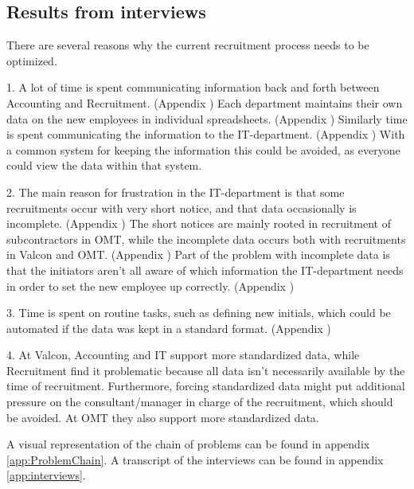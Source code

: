 \subsection{Results from interviews}
There are several reasons why the current recruitment process needs to be optimized.

1. A lot of time is spent communicating information back and forth between Accounting and Recruitment.
(Appendix )
Each department maintains their own data on the new employees in individual spreadsheets.
(Appendix )
Similarly time is spent communicating the information to the IT-department.
(Appendix )
With a common system for keeping the information this could be avoided, as everyone could view the data within that system.

2. The main reason for frustration in the IT-department is that some recruitments occur with very short notice, and that data occasionally is incomplete.
(Appendix )
The short notices are mainly rooted in recruitment of subcontractors in OMT,
while the incomplete data occurs both with recruitments in Valcon and OMT.
(Appendix )
Part of the problem with incomplete data is that the initiators aren't all aware of which information the IT-department needs in order to set the new employee up correctly.
(Appendix )

3. Time is spent on routine tasks, such as defining new initials, which could be automated if the data was kept in a standard format.
(Appendix )

4. At Valcon, Accounting and IT support more standardized data, while Recruitment find it problematic because all data isn't necessarily available by the time of recruitment.
Furthermore, forcing standardized data might put additional pressure on the consultant/manager in charge of the recruitment, which should be avoided.
At OMT they also support more standardized data.

A visual representation of the chain of problems can be found in appendix \ref{app:ProblemChain}.
A transcript of the interviews can be found in appendix \ref{app:interviews}.

